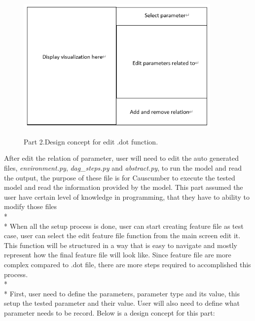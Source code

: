 \begin{figure}[H]
	\centering
	\includegraphics[width=10cm]{figures/editDot2.png}\\
	\caption{Part 2.Design concept for edit .dot function.}
	\label{fig:figure6}
\end{figure}
\noindent 
After edit the relation of parameter, user will need to edit the auto generated files, \textsl{environment.py}, \textsl{dag\_steps.py} and \textsl{abstract.py}, to run the model and read the output, the purpose of these file is for Causcumber to execute the tested model and read the information provided by the model. This part assumed the user have certain level of knowledge in programming, that they have to ability to modify those files\\*\\*
When all the setup process is done, user can start creating feature file as test case, user can select the edit feature file function from the main screen edit it. This function will be structured in a way that is easy to navigate and mostly represent how the final feature file will look like. Since feature file are more complex compared to .dot file, there are more steps required to accomplished this process. \\*\\*
First, user need to define the parameters, parameter type and its value, this setup the tested parameter and their value. User will also need to define what parameter needs to be record. Below is a design concept for this part: 

